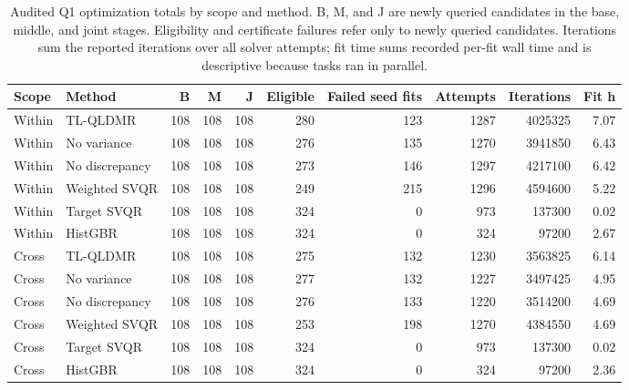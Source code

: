 \begin{table}[pos=t,width=\FullWidth]
\centering
\color{blue}
\caption{Audited Q1 optimization totals by scope and method. B, M, and J are newly queried candidates in the base, middle, and joint stages. Eligibility and certificate failures refer only to newly queried candidates. Iterations sum the reported iterations over all solver attempts; fit time sums recorded per-fit wall time and is descriptive because tasks ran in parallel.}
\label{tab:selection-v2-optimization-summary}
\small
\setlength{\tabcolsep}{3pt}
\begin{tabular}{llrrrrrrrr}
\toprule
Scope & Method & B & M & J & Eligible & Failed seed fits & Attempts & Iterations & Fit h \\
\midrule
Within & TL-QLDMR & 108 & 108 & 108 & 280 & 123 & 1287 & 4025325 & 7.07 \\
Within & No variance & 108 & 108 & 108 & 276 & 135 & 1270 & 3941850 & 6.43 \\
Within & No discrepancy & 108 & 108 & 108 & 273 & 146 & 1297 & 4217100 & 6.42 \\
Within & Weighted SVQR & 108 & 108 & 108 & 249 & 215 & 1296 & 4594600 & 5.22 \\
Within & Target SVQR & 108 & 108 & 108 & 324 & 0 & 973 & 137300 & 0.02 \\
Within & HistGBR & 108 & 108 & 108 & 324 & 0 & 324 & 97200 & 2.67 \\
Cross & TL-QLDMR & 108 & 108 & 108 & 275 & 132 & 1230 & 3563825 & 6.14 \\
Cross & No variance & 108 & 108 & 108 & 277 & 132 & 1227 & 3497425 & 4.95 \\
Cross & No discrepancy & 108 & 108 & 108 & 276 & 133 & 1220 & 3514200 & 4.69 \\
Cross & Weighted SVQR & 108 & 108 & 108 & 253 & 198 & 1270 & 4384550 & 4.69 \\
Cross & Target SVQR & 108 & 108 & 108 & 324 & 0 & 973 & 137300 & 0.02 \\
Cross & HistGBR & 108 & 108 & 108 & 324 & 0 & 324 & 97200 & 2.36 \\
\bottomrule
\end{tabular}
\end{table}
